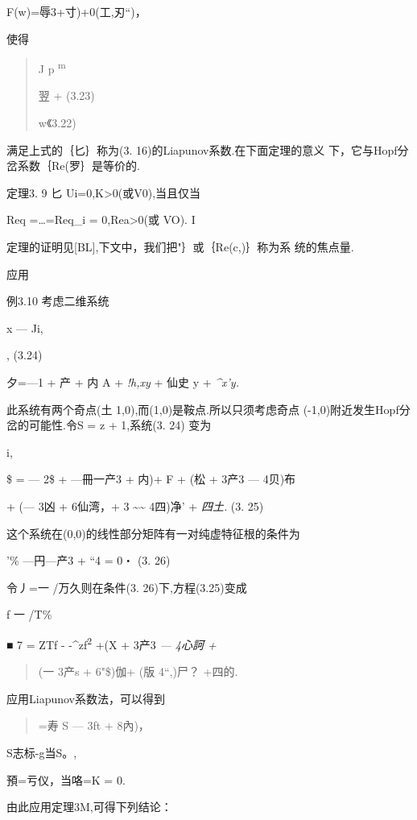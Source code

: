 \documentclass{article}
\begin{document}
F(w)=辱3+寸)+0(\textbar{}工,刃``)，

使得

\begin{quote}
J p \textsuperscript{m}

翌 + (3.23)

w《3.22)
\end{quote}

满足上式的｛匕｝称为(3. 16)的Liapunov系数.在下面定理的意义
下，它与Hopf分岔系数｛Re(罗｝是等价的.

定理3. 9 匕 Ui=0,K\textgreater{}0(或V0),当且仅当

Req =\ldots{}=Req\_i = 0,Rea\textgreater{}0(或 VO). I

定理的证明见{[}BL{]},下文中，我们把"｝或｛Re(c,)｝称为系 统的焦点量.

应用

例3.10 考虑二维系统

x --- Ji,

, (3.24)

夕=---1 + 产 + 内 A + \emph{!h,xy} + 仙史 y + \emph{\^{}x'y.}

此系统有两个奇点(土 1,0),而(1,0)是鞍点.所以只须考虑奇点
(-1,0)附近发生Hopf分岔的可能性.令S = z + 1,系统(3. 24) 变为

i,

\$ = --- 2\$ + ---冊一产3 + 内)+ F + (松 + 3产3 --- 4贝)布

+ (--- 3凶 + 6仙湾，+ 3 \textasciitilde{}\textasciitilde{} 4四)净' +
\emph{四土.} (3. 25)

这个系统在(0,0)的线性部分矩阵有一对纯虚特征根的条件为

'\% ---円---产3 + ``4 = 0・ (3. 26)

令丿=一 /万久则在条件(3. 26)下,方程(3.25)变成

f 一 /T\%

■ 7 = ZTf - -\^{}zf\textsuperscript{2} +(X + 3产3 \emph{--- 4心訶 +}

\begin{quote}
(一 3产s + 6"\$)伽+ (版 4``,)尸？ +四的.
\end{quote}

应用Liapunov系数法，可以得到

\begin{quote}
=寿 S --- 3ft + 8內)，
\end{quote}

S志标-g当S。,

預=亏仪，当咯=K = 0.

由此应用定理3M,可得下列结论：
\end{document}
